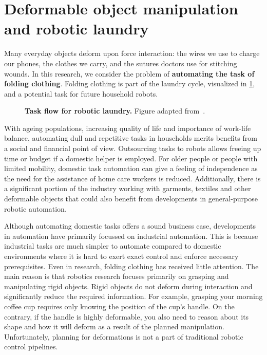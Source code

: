 \documentclass[\home/main.tex]{subfiles}
\begin{document}
\section{Deformable object manipulation and robotic laundry}
Many everyday objects deform upon force interaction: the wires we use to charge our phones, the clothes we carry, and the sutures doctors use for stitching wounds.
In this research, we consider the problem of \textbf{automating the task of folding clothing}. Folding clothing is part of the laundry cycle, visualized in \cref{fig:intro_laundry_cycle}, and a potential task for future household robots.
\begin{figure}[htbp]
    \centering
    
    \caption[Task flow for robotic laundry.]{\textbf{Task flow for robotic laundry.} Figure adapted from~\autocite{Hamajima1996}.}
    \label{fig:intro_laundry_cycle}
\end{figure}
With ageing populations, increasing quality of life and importance of work-life balance, automating dull and repetitive tasks in households merits benefits from a social and financial point of view. Outsourcing tasks to robots allows freeing up time or budget if a domestic helper is employed. For older people or people with limited mobility, domestic task automation can give a feeling of independence as the need for the assistance of home care workers is reduced.
Additionally, there is a significant portion of the industry working with garments, textiles and other deformable objects that could also benefit from developments in general-purpose robotic automation.

Although automating domestic tasks offers a sound business case, developments in automation have primarily focussed on industrial automation. This is because industrial tasks are much simpler to automate compared to domestic environments where it is hard to exert exact control and enforce necessary prerequisites. Even in research, folding clothing has received little attention. The main reason is that robotics research focuses primarily on grasping and manipulating rigid objects. Rigid objects do not deform during interaction and significantly reduce the required information. For example, grasping your morning coffee cup requires only knowing the position of the cup's handle.
On the contrary, if the handle is highly deformable, you also need to reason about its shape and how it will deform as a result of the planned manipulation. Unfortunately, planning for deformations is not a part of traditional robotic control pipelines.
\end{document}
